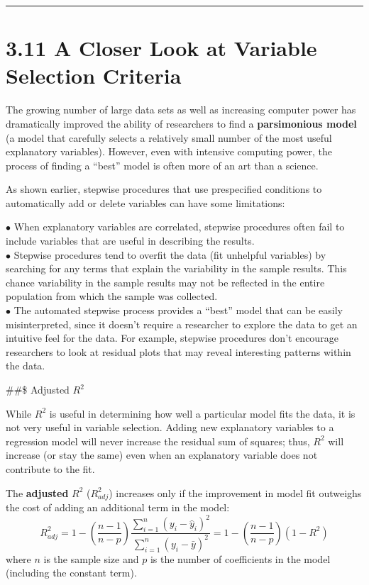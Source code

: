 \documentclass[
]{report}
\begin{document}
\begin{center}\rule{0.5\linewidth}{0.5pt}\end{center}

\section{3.11 A Closer Look at Variable Selection Criteria}\label{a-closer-look-at-variable-selection-criteria}

The growing number of large data sets as well as increasing computer power has dramatically improved the ability of researchers to find a \textbf{parsimonious model} (a model that carefully selects a relatively small number of the most useful explanatory variables). However, even with intensive computing power, the process of finding a ``best'' model is often more of an art than a science.

As shown earlier, stepwise procedures that use prespecified conditions to automatically add or delete variables can have some limitations:

\(\bullet\) When explanatory variables are correlated, stepwise procedures often fail to include variables that are useful in describing the results.\\
\(\bullet\) Stepwise procedures tend to overfit the data (fit unhelpful variables) by searching for any terms that explain the variability in the sample results. This chance variability in the sample results may not be reflected in the entire population from which the sample was collected.\\
\(\bullet\) The automated stepwise process provides a ``best'' model that can be easily misinterpreted, since it doesn't require a researcher to explore the data to get an intuitive feel for the data. For example, stepwise procedures don't encourage researchers to look at residual plots that may reveal interesting patterns within the data.

\#\#\$ Adjusted \(R^2\)

While \(R^2\) is useful in determining how well a particular model fits the data, it is not very useful in variable selection. Adding new explanatory variables to a regression model will never increase the residual sum of squares; thus, \(R^2\) will increase (or stay the same) even when an explanatory variable does not contribute to the fit.

The \textbf{adjusted} \(R^2\) (\(R^2_{adj}\)) increases only if the improvement in model fit outweighs the cost of adding an additional term in the model:
\begin{equation}
R^2_{adj} = 1 - \left(\frac{n - 1}{n - p}\right)\frac{\sum_{i=1}^n (y_i - \hat{y}_i)^2}{\sum_{i=1}^n (y_i - \bar{y})^2}
= 1 - \left(\frac{n - 1}{n - p}\right)(1 - R^2)
\tag{3.13}
\end{equation}
where \(n\) is the sample size and \(p\) is the number of coefficients in the model (including the constant term).
\end{document}

